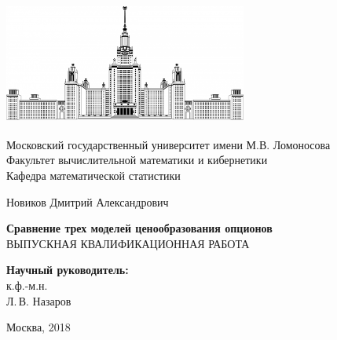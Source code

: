 \documentclass[oneside, final, 12pt, a4paper]{article}
\begin{document}
\begin{titlepage}

\begin{center}
  \includegraphics[width=8cm, height=4cm]{img/msu_logo.jpg}
\end{center}

\begin{center}
Московский государственный университет имени М.В. Ломоносова\\
\vspace{0.1 cm}
Факультет вычислительной математики и кибернетики\\
\vspace{0.1 cm}
Кафедра математической статистики

\vspace{3cm}
{\Large Новиков Дмитрий Александрович }\\
\vspace{1cm}

{\bf\LARGE Сравнение трех моделей ценообразования опционов}\\ \vspace{2cm}
ВЫПУСКНАЯ КВАЛИФИКАЦИОННАЯ РАБОТА

\end{center}
\vspace{2cm}
\begin{flushright}

{\bf Научный руководитель:}\\
к.ф.-м.н.\\
Л.\,В. Назаров

\end{flushright}

 \vspace{4.5cm}

\centerline {Москва, 2018}
\end{titlepage}

\newpage
\tableofcontents

\newpage
\large
{}
\leftline{\hrulefill}
\vskip0.25cm
\normalfont
\end{document}
